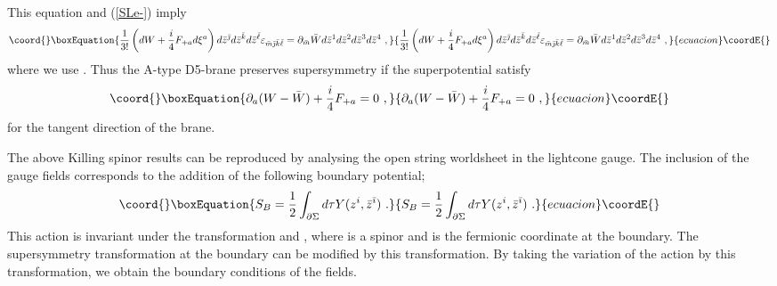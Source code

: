 \documentclass[a4paper,12pt]{article}
\numberwithin{equation}{section}
\providecommand{\del}{\partial}
\providecommand{\ib}{\bar{\imath}}
\providecommand{\jb}{\bar{\jmath}}
\providecommand{\kb}{\bar{k}}
\providecommand{\lb}{\bar{\ell}}
\providecommand{\mb}{\bar{m}}
\providecommand{\zb}{\bar{z}}
\providecommand{\ve}{\varepsilon}
\begin{document}
This equation and (\ref{SLe-}) imply 
\begin{equation}\coord{}\boxEquation{
 \frac{1}{3!} \left( dW + \frac{i}{4 } F_{+a} d \xi^a \right) 
 d\zb^{\jb}d\zb^{\kb}d\zb^{\lb}\ve_{\mb\jb\kb\lb}
  =\del_{\mb}\bar W d\zb^{1}d\zb^{2}d\zb^{3}d\zb^{4}~,
}{
 \frac{1}{3!} \left( dW + \frac{i}{4 } F_{+a} d \xi^a \right) 
 d\zb^{\jb}d\zb^{\kb}d\zb^{\lb}\ve_{\mb\jb\kb\lb}
  =\del_{\mb}\bar W d\zb^{1}d\zb^{2}d\zb^{3}d\zb^{4}~,
}{ecuacion}\coordE{}\end{equation}
where we use \coordHE{}.
Thus the A-type D5-brane  preserves 
supersymmetry if the superpotential satisfy
\begin{equation}\coord{}\boxEquation{
 \partial_a (W -  \bar{W}) + \frac{i}{4} F_{+a} = 0~,
\label{modAD5}
}{
 \partial_a (W -  \bar{W}) + \frac{i}{4} F_{+a} = 0~,
}{ecuacion}\coordE{}\end{equation}
for the tangent direction \coordHE{} of the brane.


The above Killing spinor results can be reproduced by analysing the  
open string worldsheet in the lightcone gauge.
The inclusion of the gauge fields corresponds to the addition of the following
boundary potential;
\begin{equation}\coord{}\boxEquation{
 S_B = 
 \frac{1}{2} \int _{\partial \Sigma} d \tau Y ( z^i, \zb^{\ib})~.
}{
 S_B = 
 \frac{1}{2} \int _{\partial \Sigma} d \tau Y ( z^i, \zb^{\ib})~.
}{ecuacion}\coordE{}\end{equation}
This action is invariant under the transformation \coordHE{}
and \myHighlight{$\delta_B \psi_{B}^i = \kappa f^i (z, \zb) $}\coordHE{}, where \myHighlight{$\kappa$}\coordHE{} is a
spinor and \coordHE{} is the fermionic coordinate at the boundary.
The supersymmetry transformation at the boundary can be modified by this
transformation.
By taking the variation of the action by this transformation, 
we obtain the boundary conditions of the fields.
\end{document}

